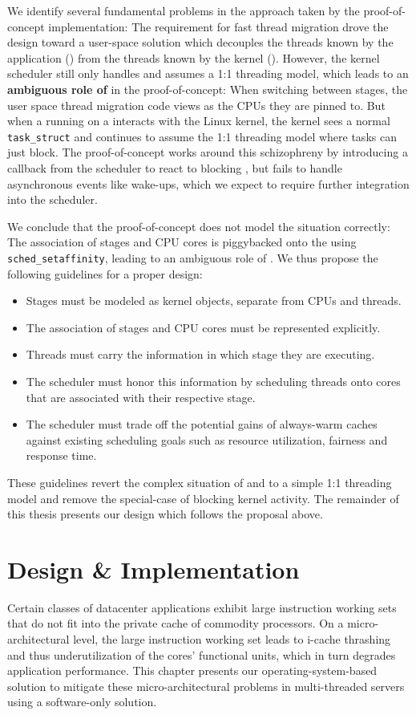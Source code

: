 \documentclass[12pt,a4paper]{book}
\begin{document}
We identify several fundamental problems in the approach taken by the proof-of-concept implementation:
The requirement for fast thread migration drove the design toward a user-space solution which decouples the threads known by the application (\ults) from the threads known by the kernel (\klts).
However, the kernel scheduler still only handles \klts and assumes a 1:1 threading model, which leads to an \textbf{ambiguous role of \klts} in the proof-of-concept:
When switching between stages, the user space thread migration code views \klts as the CPUs they are pinned to.
But when a \ult running on a \klt interacts with the Linux kernel, the kernel sees a normal \texttt{task\_struct} and continues to assume the 1:1 threading model where tasks can just block.
The proof-of-concept works around this schizophreny by introducing a callback from the scheduler to react to blocking \klts, but fails to handle asynchronous events like wake-ups, which we expect to require further integration into the scheduler.

We conclude that the proof-of-concept does not model the situation correctly:
The association of stages and CPU cores is piggybacked onto the \klts using \texttt{sched\_setaffinity}, leading to an ambiguous role of \klts.
We thus propose the following guidelines for a proper design:
\begin{itemize}%
    \item Stages must be modeled as kernel objects, separate from CPUs and threads.
    \item The association of stages and CPU cores must be represented explicitly.
    \item Threads must carry the information in which stage they are executing.
    \item The scheduler must honor this information by scheduling threads onto cores that are associated with their respective stage.
    \item The scheduler must trade off the potential gains of always-warm caches against existing scheduling goals such as resource utilization, fairness and response time.
\end{itemize}%
These guidelines revert the complex situation of \ults and \klts to a simple 1:1 threading model and remove the special-case of blocking kernel activity.
The remainder of this thesis presents our design which follows the proposal above.


\chapter{Design \& Implementation}\label{ch:di}
Certain classes of datacenter applications exhibit large instruction working sets that do not fit into the private cache of commodity processors.
On a micro-architectural level, the large instruction working set leads to i-cache thrashing and thus underutilization of the cores' functional units, which in turn degrades application performance.
This chapter presents our operating-system-based solution to mitigate these micro-architectural problems in multi-threaded servers using a software-only solution.
\end{document}
